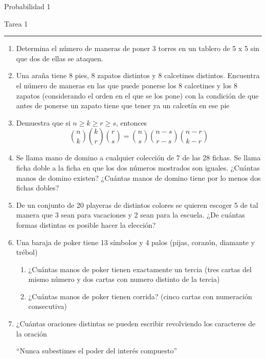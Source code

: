 \documentclass{report}
\begin{document}
\begin{center}
    \textsf{\Large Probabilidad 1}
    \par\medskip
    \textsf{\large Tarea 1}
\end{center}
    \hrule
    \par\bigskip

\begin{enumerate}
    \item Determina el número de maneras de poner 3 torres en un tablero de 5 x 5 sin que dos de ellas se ataquen.
    
    \item Una araña tiene 8 pies, 8 zapatos distintos y 8 calcetines distintos. Encuentra el número de maneras en las que puede ponerse los 8 calcetines y los 8 zapatos (considerando el orden en el que se los pone) con la condición de que antes de ponerse un zapato tiene que tener ya un calcetín en ese pie

    \item Demuestra que si $n \geq k \geq r \geq s$, entonces 
    \[
       \binom{n}{k}\binom{k}{r}\binom{r}{s} = \binom{n}{s}\binom{n-s}{r-s}\binom{n-r}{k-r} %
    \]

    \item Se llama mano de domino a cualquier colección de 7 de las 28 fichas. Se llama ficha doble a la ficha en que los dos números mostrados son iguales. ¿Cuántas manos de domino existen? ¿Cuántas manos de domino tiene por lo menos dos fichas dobles? 

    \item De un conjunto de 20 playeras de distintos colores se quieren escoger 5 de tal manera que 3 sean para vacaciones y 2 sean para la escuela. ¿De cuántas formas distintas es posible hacer la elección?

    \item Una baraja de poker tiene 13 símbolos y 4 palos (pijas, corazón, diamante y trébol)
    \begin{enumerate}
        \item ¿Cuántas manos de poker tienen exactamente un tercia (tres cartas del mismo nùmero y dos cartas con numero distinto de la tercia)
        \item ¿Cuántas manos de poker tienen corrida? (cinco cartas con numeración consecutiva)
    \end{enumerate}

    \item ¿Cuántas oraciones distintas se pueden escribir revolviendo los caracteres de la oración
    
    \begin{center} 
    ``Nunca subestimes el poder del interés compuesto''
    \end{center}
\end{enumerate}    
    
\end{document}
